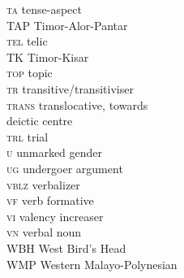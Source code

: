 \begin{multicols}{2}
\begin{tabbing}
 \textsc{ta}  \> tense-aspect \\
 \textsc{TAP}  \> Timor-Alor-Pantar \\
 \textsc{tel}  \> telic \\
 \textsc{TK}  \> Timor-Kisar \\
 \textsc{top}  \> topic \\
 \textsc{tr}  \> transitive\slash transitiviser \\
 \textsc{trans}  \> translocative, towards\\\> deictic centre \\
 \textsc{trl}  \> trial \\
 \textsc{u}  \> unmarked gender \\
 \textsc{ug}  \> undergoer argument \\
 \textsc{vblz}  \> verbalizer \\
 \textsc{vf}  \> verb formative \\
 \textsc{vi}  \> valency increaser \\
 \textsc{vn}  \> verbal noun \\
 \textsc{WBH}  \> West Bird's Head \\
 \textsc{WMP}  \> Western Malayo-Polynesian 
\end{tabbing}
\end{multicols}
